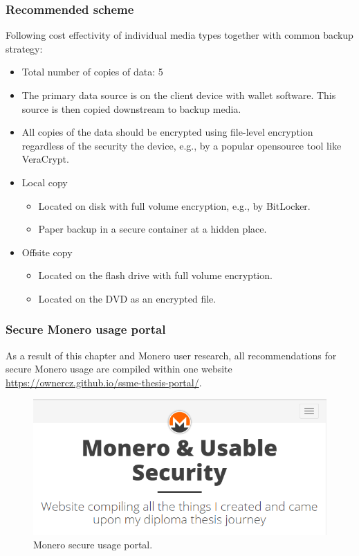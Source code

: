 \documentclass[
  printed, %
  table,   %
  nolof,     %
  nolot,     %
           oneside, color
]{fithesis3}
\begin{document}
\subsubsection{Recommended scheme}
Following cost effectivity of individual media types together with common backup strategy:
\begin{itemize}
\itemsep0em
\item Total number of copies of data: 5
\item The primary data source is on the client device with wallet software. This source is then copied downstream to backup media.
\item All copies of the data should be encrypted using file-level encryption regardless of the security the device, e.g., by a popular opensource tool like VeraCrypt.
\item Local copy
\begin{itemize}
\itemsep0em
\item Located on disk with full volume encryption, e.g., by BitLocker.
\item Paper backup in a secure container at a hidden place.
\end{itemize}
\item Offsite copy
\begin{itemize}
\itemsep0em
\item Located on the flash drive with full volume encryption.
\item Located on the DVD as an encrypted file.
\end{itemize}
\end{itemize}

\subsubsection{Secure Monero usage portal}
As a result of this chapter and Monero user research, all recommendations for secure Monero usage are compiled within one website \url{https://ownercz.github.io/ssme-thesis-portal/}. %


\begin{figure}[H]
\begin{center}

    
 \includegraphics[trim={0 0 5px 1px},clip,width=1\textwidth]{Screenshot_7.png}
    \caption{Monero secure usage portal.}

    \label{pic:moneroweb}
\end{center}
    \end{figure}
    
\end{document}
